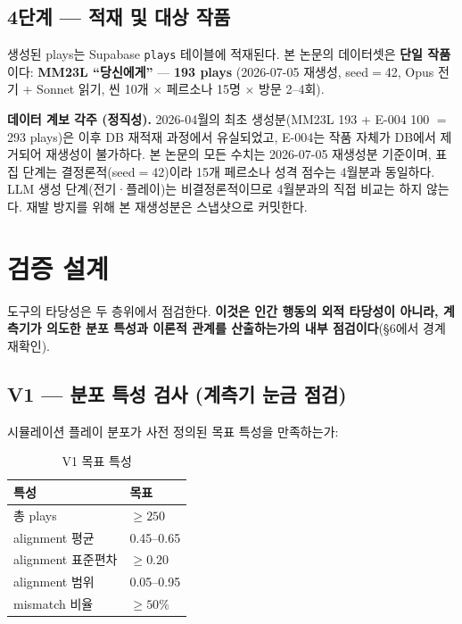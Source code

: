 \documentclass[11pt, a4paper]{article}
\begin{document}
\subsection{4단계 --- 적재 및 대상 작품}

생성된 plays는 Supabase \texttt{plays} 테이블에 적재된다. 본 논문의 데이터셋은 \textbf{단일 작품}이다: \textbf{MM23L ``당신에게''} --- \textbf{193 plays} (2026-07-05 재생성, seed$=$42, Opus 전기 + Sonnet 읽기, 씬 10개 $\times$ 페르소나 15명 $\times$ 방문 2--4회).

\noindent\textbf{데이터 계보 각주 (정직성).} 2026-04월의 최초 생성분(MM23L 193 + E-004 100 $=$ 293 plays)은 이후 DB 재적재 과정에서 유실되었고, E-004는 작품 자체가 DB에서 제거되어 재생성이 불가하다. 본 논문의 모든 수치는 2026-07-05 재생성분 기준이며, 표집 단계는 결정론적(seed$=$42)이라 15개 페르소나 성격 점수는 4월분과 동일하다. LLM 생성 단계(전기·플레이)는 비결정론적이므로 4월분과의 직접 비교는 하지 않는다. 재발 방지를 위해 본 재생성분은 스냅샷으로 커밋한다.

\section{검증 설계}

도구의 타당성은 두 층위에서 점검한다. \textbf{이것은 인간 행동의 외적 타당성이 아니라, 계측기가 의도한 분포 특성과 이론적 관계를 산출하는가의 내부 점검이다}(\S6에서 경계 재확인).

\subsection{V1 --- 분포 특성 검사 (계측기 눈금 점검)}

시뮬레이션 플레이 분포가 사전 정의된 목표 특성을 만족하는가:

\begin{table}[H]
\centering
\caption{V1 목표 특성}
\begin{tabular}{l l}
\toprule
\textbf{특성} & \textbf{목표} \\
\midrule
총 plays & $\geq 250$ \\
alignment 평균 & 0.45--0.65 \\
alignment 표준편차 & $\geq 0.20$ \\
alignment 범위 & 0.05--0.95 \\
mismatch 비율 & $\geq 50\%$ \\
\bottomrule
\end{tabular}
\end{table}
\end{document}
